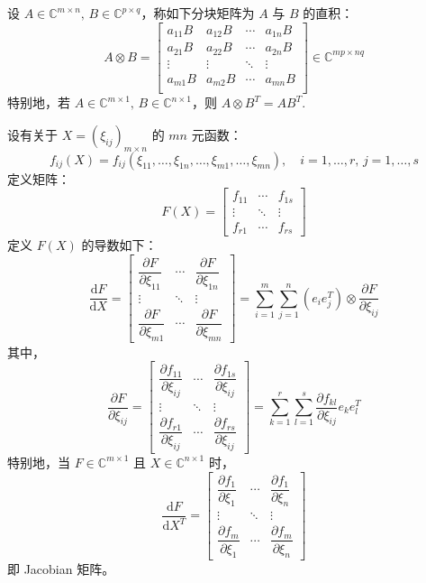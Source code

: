 \begin{definition}[直积 / Kronecker 积]
设 $A\in\mathbb C^{m\times n},\,B\in\mathbb C^{p\times q}$，称如下分块矩阵为 $A$ 与 $B$ 的直积：
\[
    A\otimes B=\begin{bmatrix}a_{11}B&a_{12}B&\cdots&a_{1n}B\\a_{21}B&a_{22}B&\cdots&a_{2n}B\\\vdots&\vdots&\ddots&\vdots\\a_{m1}B&a_{m2}B&\cdots&a_{mn}B\\\end{bmatrix}\in\mathbb C^{mp\times nq}
\]
特别地，若 $A\in\mathbb C^{m\times 1},\,B\in\mathbb C^{n\times 1}$，则 $A\otimes B^T=AB^T$.
\end{definition}

\begin{definition}[矩阵函数对矩阵的导数]
设有关于 $X=(\xi_{ij})_{m\times n}$ 的 $mn$ 元函数：
\[
    f_{ij}(X)=f_{ij}(\xi_{11},\ldots,\xi_{1n},\ldots,\xi_{m1},\ldots,\xi_{mn}),\quad i=1,\ldots,r,\,j=1,\ldots,s
\]
定义矩阵：
\[
    F(X)=\begin{bmatrix}f_{11}&\cdots&f_{1s}\\\vdots&\ddots&\vdots\\f_{r1}&\cdots&f_{rs}\end{bmatrix}
\]
定义 $F(X)$ 的导数如下：
\[
    \frac{\mathrm dF}{\mathrm dX}=
    \begin{bmatrix}
    \dfrac{\partial F}{\partial \xi_{11}}&\cdots&\dfrac{\partial F}{\partial \xi_{1n}}\\
    \vdots&\ddots&\vdots\\
    \dfrac{\partial F}{\partial \xi_{m1}}&\cdots&\dfrac{\partial F}{\partial \xi_{mn}}
    \end{bmatrix}=\sum_{i=1}^m\sum_{j=1}^n(e_ie_j^T)\otimes\frac{\partial F}{\partial \xi_{ij}}
\]
其中，
\[
    \frac{\partial F}{\partial \xi_{ij}}=
    \begin{bmatrix}
    \dfrac{\partial f_{11}}{\partial \xi_{ij}}&\cdots&\dfrac{\partial f_{1s}}{\partial \xi_{ij}}\\
    \vdots&\ddots&\vdots\\
    \dfrac{\partial f_{r1}}{\partial \xi_{ij}}&\cdots&\dfrac{\partial f_{rs}}{\partial \xi_{ij}}
    \end{bmatrix}=\sum_{k=1}^r\sum_{l=1}^s\frac{\partial f_{kl}}{\partial \xi_{ij}}e_ke_l^T
\]
特别地，当 $F\in\mathbb C^{m\times 1}$ 且 $X\in\mathbb C^{n\times 1}$ 时，
\[
    \frac{\mathrm dF}{\mathrm dX^T}=
    \begin{bmatrix}
    \dfrac{\partial f_{1}}{\partial \xi_{1}}&\cdots&\dfrac{\partial f_{1}}{\partial \xi_{n}}\\
    \vdots&\ddots&\vdots\\
    \dfrac{\partial f_{m}}{\partial \xi_{1}}&\cdots&\dfrac{\partial f_{m}}{\partial \xi_{n}}
    \end{bmatrix}
\]
即 Jacobian 矩阵。
\end{definition}

